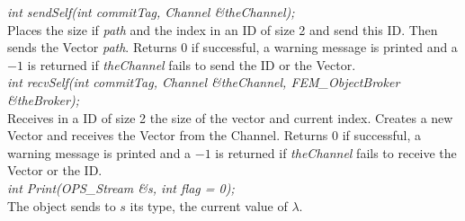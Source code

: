 {\em int sendSelf(int commitTag, Channel \&theChannel); } \\ 
Places the size if {\em path} and the index in an ID of size 2 and send this
ID. Then sends the Vector {\em path}. Returns $0$ if successful, a
warning message is printed and a $-1$ is returned if {\em theChannel}
fails to send the ID or the Vector. \\ 

{\em int recvSelf(int commitTag, Channel \&theChannel, 
FEM\_ObjectBroker \&theBroker); } \\ 
Receives in a ID of size 2 the size of the vector and current index.
Creates a new Vector and receives the Vector from the Channel. 
Returns $0$ if successful, a warning message is printed and a $-1$ is
returned if {\em theChannel} fails to receive the Vector or the ID.\\

{\em int Print(OPS_Stream \&s, int flag = 0);}\\
The object sends to $s$ its type, the current value of $\lambda$.
